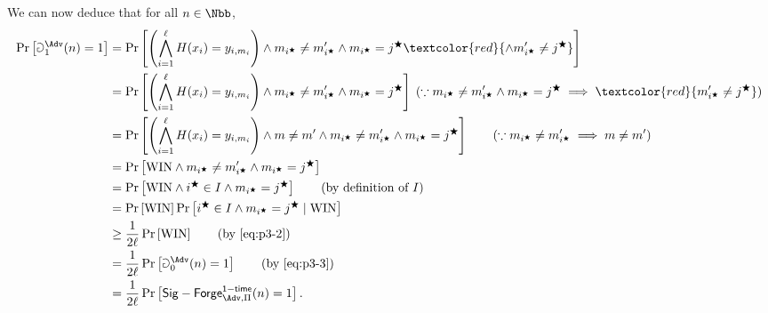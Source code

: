 \begin{answer}
    We can now deduce that for all $n\in\Nbb$,
    \begin{align}\label{eq:p3-5}
        \Pr\left[\Game_1^\Adv(n)=1  \right]
        &= \Pr\left[\left( \bigwedge_{i=1}^\ell H(x_i)=y_{i, m_i} \right) \land m_{i^\bigstar}\neq m'_{i^\bigstar} \land  m_{i^\bigstar} = j^\bigstar  \textcolor{red}{\land m'_{i^\bigstar}\neq j^\bigstar} \right] \notag\\
        &= \Pr\left[\left( \bigwedge_{i=1}^\ell H(x_i)=y_{i, m_i} \right) \land m_{i^\bigstar}\neq m'_{i^\bigstar} \land  m_{i^\bigstar} = j^\bigstar  \right] 
        \; (\because m_{i^\bigstar}\neq m'_{i^\bigstar} \land  m_{i^\bigstar} = j^\bigstar \implies \textcolor{red}{m'_{i^\bigstar}\neq j^\bigstar}  )\notag\\
        &= \Pr\left[ \left( \bigwedge_{i=1}^\ell H(x_i)=y_{i, m_i} \right) \land m\neq m' \land m_{i^\bigstar}\neq m'_{i^\bigstar} \land  m_{i^\bigstar} = j^\bigstar  \right]
        \qquad (\because m_{i^\bigstar}\neq m'_{i^\bigstar} \implies m\neq m') \notag\\
        &= \Pr\left[ \textrm{WIN} \land m_{i^\bigstar}\neq m'_{i^\bigstar} \land  m_{i^\bigstar} = j^\bigstar  \right] \notag\\
        &= \Pr\left[ \textrm{WIN} \land i^\bigstar\in I \land m_{i^\bigstar}= j^\bigstar \right]
        \qquad (\textrm{by definition of } I) \notag\\
        &= \Pr\left[ \textrm{WIN}\right] \Pr\left[  i^\bigstar\in I \land m_{i^\bigstar}= j^\bigstar \mid \textrm{WIN}\right] \notag\\
        &\ge \frac{1}{2\ell}\Pr\left[ \textrm{WIN}\right] 
        \qquad (\textrm{by \eqref{eq:p3-2}}) \notag\\
        &= \frac{1}{2\ell}  \Pr\left[\Game_0^\Adv(n)=1  \right]
        \qquad (\textrm{by \eqref{eq:p3-3}})  \notag\\
        &= \frac{1}{2\ell}  \Pr\left[\mathsf{Sig-Forge}^{\mathsf{1-time}}_{\Adv, \Pi}(n)=1  \right].
    \end{align}
    

\end{answer}
